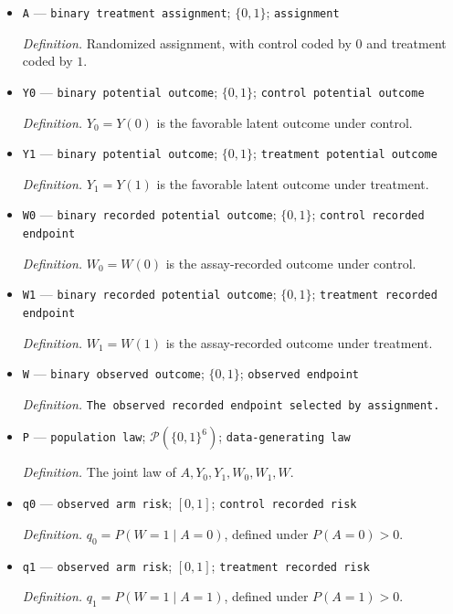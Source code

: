 \documentclass{article}
\begin{document}
\begin{itemize}
  \item \texttt{A} --- \texttt{binary treatment assignment}; \(\{0,1\}\); \texttt{assignment}
  \par\smallskip\noindent\emph{Definition.} Randomized assignment, with control coded by \(0\) and treatment coded by \(1\).
  \item \texttt{Y0} --- \texttt{binary potential outcome}; \(\{0,1\}\); \texttt{control potential outcome}
  \par\smallskip\noindent\emph{Definition.} \(Y_0=Y(0)\) is the favorable latent outcome under control.
  \item \texttt{Y1} --- \texttt{binary potential outcome}; \(\{0,1\}\); \texttt{treatment potential outcome}
  \par\smallskip\noindent\emph{Definition.} \(Y_1=Y(1)\) is the favorable latent outcome under treatment.
  \item \texttt{W0} --- \texttt{binary recorded potential outcome}; \(\{0,1\}\); \texttt{control recorded endpoint}
  \par\smallskip\noindent\emph{Definition.} \(W_0=W(0)\) is the assay-recorded outcome under control.
  \item \texttt{W1} --- \texttt{binary recorded potential outcome}; \(\{0,1\}\); \texttt{treatment recorded endpoint}
  \par\smallskip\noindent\emph{Definition.} \(W_1=W(1)\) is the assay-recorded outcome under treatment.
  \item \texttt{W} --- \texttt{binary observed outcome}; \(\{0,1\}\); \texttt{observed endpoint}
  \par\smallskip\noindent\emph{Definition.} \texttt{The observed recorded endpoint selected by assignment.}
  \item \texttt{P} --- \texttt{population law}; \(\mathcal P(\{0,1\}^{6})\); \texttt{data-\allowbreak{}generating law}
  \par\smallskip\noindent\emph{Definition.} The joint law of \(A,Y_0,Y_1,W_0,W_1,W\).
  \item \texttt{q0} --- \texttt{observed arm risk}; \([0,1]\); \texttt{control recorded risk}
  \par\smallskip\noindent\emph{Definition.} \(q_0=P(W=1\mid A=0)\), defined under \(P(A=0)>0\).
  \item \texttt{q1} --- \texttt{observed arm risk}; \([0,1]\); \texttt{treatment recorded risk}
  \par\smallskip\noindent\emph{Definition.} \(q_1=P(W=1\mid A=1)\), defined under \(P(A=1)>0\).

\end{itemize}
\end{document}
